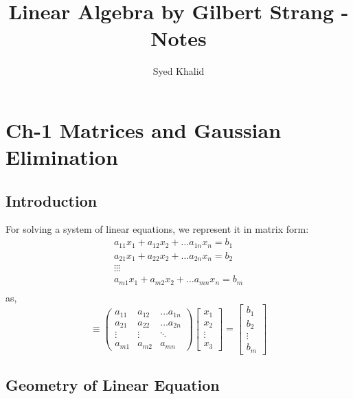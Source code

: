 \documentclass{article}
\title{Linear Algebra by Gilbert Strang - Notes}
\author{Syed Khalid }
\newcommand{\vn}[3]{\begin{bmatrix} #1 \\ #2 \\ \vdots \\#3 \end{bmatrix}}
\newcommand{\pmmn}[9]{\begin{pmatrix} #1 & #2 & #3 \\ #4 & #5 & #6 \\ \vdots & \vdots & \ddots \\ #7 & #8 & #9 \end{pmatrix}}
\begin{document}
\maketitle 
\section{Ch-1 Matrices and Gaussian Elimination}
\subsection{Introduction}
For solving a system of linear equations, we represent it in matrix form:
\begin{align*}
a_{11}x_1 + a_{12}x_2 + \dots a_{1n}x_n = b_1 \\
    a_{21}x_1 + a_{22}x_2 +\dots a_{2n}x_n = b_2 \\
    \vdots \vdots \vdots \\
    a_{m1}x_1 + a_{m2}x_2 + \dots a_{mn}x_n = b_m \\ 
\end{align*} 
as, 
$$ \equiv \pmmn{a_{11}}{a_{12}}{\dots a_{1n}}
{a_{21}}{a_{22}}{\dots a_{2n}}
{a_{m1}}{a_{m2}}{ a_{mn}} \vn{x_1}{x_2}{x_3} =
 \vn{b_1}{b_2}{b_m}$$ 

\subsection{Geometry of Linear Equation}
\end{document}
